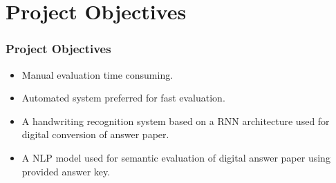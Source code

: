 \section{Project Objectives} 

\begin{frame}
\frametitle{Project Objectives}
\begin{itemize}
    \item Manual evaluation time consuming.
    \item Automated system preferred for fast evaluation.
    \item A handwriting recognition system based on a RNN architecture used for digital conversion of answer paper.
    \item A NLP model used for semantic evaluation of digital answer paper using provided answer key.
\end{itemize}
\end{frame}